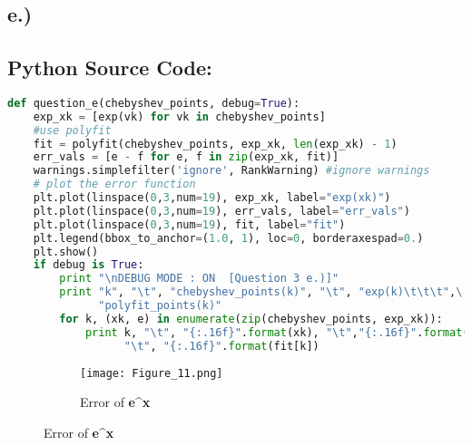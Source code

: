 \documentclass{article}
\begin{document}
\pagebreak

\subsection*{e.)}
\subsection*{Python Source Code:}
\begin{lstlisting}[language=Python]
def question_e(chebyshev_points, debug=True):
    exp_xk = [exp(vk) for vk in chebyshev_points]
    #use polyfit
    fit = polyfit(chebyshev_points, exp_xk, len(exp_xk) - 1)
    err_vals = [e - f for e, f in zip(exp_xk, fit)]
    warnings.simplefilter('ignore', RankWarning) #ignore warnings
    # plot the error function
    plt.plot(linspace(0,3,num=19), exp_xk, label="exp(xk)")
    plt.plot(linspace(0,3,num=19), err_vals, label="err_vals")
    plt.plot(linspace(0,3,num=19), fit, label="fit")
    plt.legend(bbox_to_anchor=(1.0, 1), loc=0, borderaxespad=0.)
    plt.show()
    if debug is True:
        print "\nDEBUG MODE : ON  [Question 3 e.)]"
        print "k", "\t", "chebyshev_points(k)", "\t", "exp(k)\t\t\t",\
              "polyfit_points(k)"
        for k, (xk, e) in enumerate(zip(chebyshev_points, exp_xk)):
            print k, "\t", "{:.16f}".format(xk), "\t","{:.16f}".format(e), \
                  "\t", "{:.16f}".format(fit[k])
\end{lstlisting}

\begin{figure}[h!]
  \centering
  \begin{subfigure}{\linewidth}
    \texttt{[image: Figure\_11.png]}
    \caption{Error of \textbf{e^x} }
  \end{subfigure}
\end{figure}

\pagebreak
\end{document}

